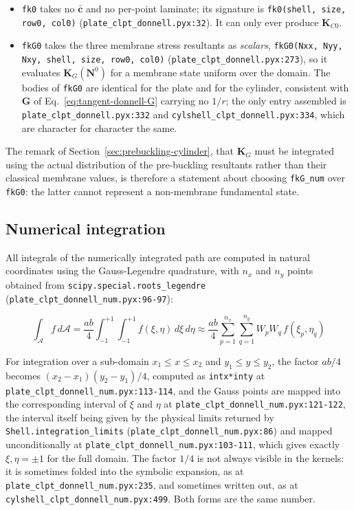 \begin{itemize}
	\item \texttt{fk0} takes no $\bar{\boldsymbol{c}}$ and no per-point laminate; its signature is \texttt{fk0(shell, size, row0, col0)} (\texttt{plate\_clpt\_donnell.pyx:32}). It can only ever produce $\boldsymbol{K}_{C0}$.
	\item \texttt{fkG0} takes the three membrane stress resultants as \emph{scalars}, \texttt{fkG0(Nxx, Nyy, Nxy, shell, size, row0, col0)} (\texttt{plate\_clpt\_donnell.pyx:273}), so it evaluates $\boldsymbol{K}_G(\boldsymbol{N}^0)$ for a membrane state uniform over the domain. The bodies of \texttt{fkG0} are identical for the plate and for the cylinder, consistent with $\boldsymbol{G}$ of Eq.~\ref{eq:tangent-donnell-G} carrying no $1/r$; the only entry assembled is \texttt{plate\_clpt\_donnell.pyx:332} and \texttt{cylshell\_clpt\_donnell.pyx:334}, which are character for character the same.
\end{itemize}

The remark of Section~\ref{sec:prebuckling-cylinder}, that $\boldsymbol{K}_G$ must be integrated using the actual distribution of the pre-buckling resultants rather than their classical membrane values, is therefore a statement about choosing \texttt{fkG\_num} over \texttt{fkG0}: the latter cannot represent a non-membrane fundamental state.

\subsection{Numerical integration}\label{sec:tangent-donnell-quadrature}

All integrals of the numerically integrated path are computed in natural coordinates using the Gauss-Legendre quadrature, with $n_x$ and $n_y$ points obtained from \texttt{scipy.special.roots\_legendre} (\texttt{plate\_clpt\_donnell\_num.pyx:96-97}):

\begin{equation}\label{eq:tangent-donnell-quadrature}
	\int_{\mathcal{A}} f \, d\mathcal{A} = \frac{ab}{4} \int_{-1}^{+1} \int_{-1}^{+1} f(\xi, \eta) \, d\xi \, d\eta
	\approx \frac{ab}{4} \sum_{p=1}^{n_x} \sum_{q=1}^{n_y} W_p W_q \, f(\xi_p, \eta_q)
\end{equation}

For integration over a sub-domain $x_1 \le x \le x_2$ and $y_1 \le y \le y_2$, the factor $ab/4$ becomes $(x_2-x_1)(y_2-y_1)/4$, computed as \texttt{intx*inty} at \texttt{plate\_clpt\_donnell\_num.pyx:113-114}, and the Gauss points are mapped into the corresponding interval of $\xi$ and $\eta$ at \texttt{plate\_clpt\_donnell\_num.pyx:121-122}, the interval itself being given by the physical limits returned by \texttt{Shell.integration\_limits} (\texttt{plate\_clpt\_donnell\_num.pyx:86}) and mapped unconditionally at \texttt{plate\_clpt\_donnell\_num.pyx:103-111}, which gives exactly $\xi, \eta = \pm 1$ for the full domain. The factor $1/4$ is not always visible in the kernels: it is sometimes folded into the symbolic expansion, as at \texttt{plate\_clpt\_donnell\_num.pyx:235}, and sometimes written out, as at \texttt{cylshell\_clpt\_donnell\_num.pyx:499}. Both forms are the same number.

